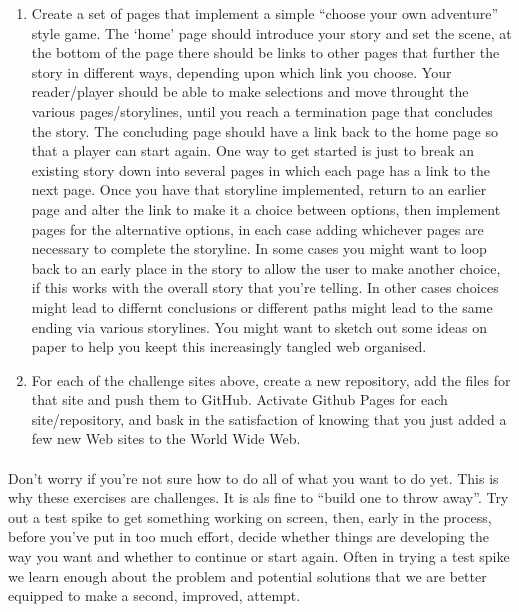 \documentclass[10pt, a4paper]{article}
\begin{document}
\begin{enumerate}
\item Create a set of pages that implement a simple ``choose your own adventure'' style game. The `home' page should introduce your story and set the scene, at the bottom of the page there should be links to other pages that further the story in different ways, depending upon which link you choose. Your reader/player should be able to make selections and move throught the various pages/storylines, until you reach a termination page that concludes the story. The concluding page should have a link back to the home page so that a player can start again. One way to get started is just to break an existing story down into several pages in which each page has a link to the next page. Once you have that storyline implemented, return to an earlier page and alter the link to make it a choice between options, then implement pages for the alternative options, in each case adding whichever pages are necessary to complete the storyline. In some cases you might want to loop back to an early place in the story to allow the user to make another choice, if this works with the overall story that you're telling. In other cases choices might lead to differnt conclusions or different paths might lead to the same ending via various storylines. You might want to sketch out some ideas on paper to help you keept this increasingly tangled web organised.
\item For each of the challenge sites above, create a new repository, add the files for that site and push them to GitHub. Activate Github Pages for each site/repository, and bask in the satisfaction of knowing that you just added a few new Web sites to the World Wide Web.
\end{enumerate}

\paragraph{} Don't worry if you're not sure how to do all of what you want to do yet. This is why these exercises are challenges. It is als fine to ``build one to throw away''. Try out a test spike to get something working on screen, then, early in the process, before you've put in too much effort, decide whether things are developing the way you want and whether to continue or start again. Often in trying a test spike we learn enough about the problem and potential solutions that we are better equipped to make a second, improved, attempt.
\end{document}
